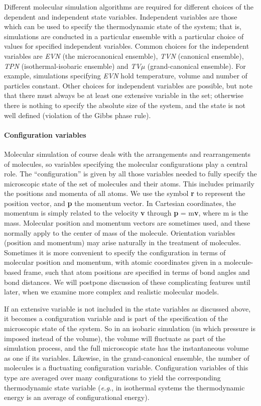 \documentclass[]{article}
\let\oldparagraph\paragraph
\renewcommand{\paragraph}[1]{\oldparagraph{#1}\mbox{}}
\begin{document}
Different molecular simulation algorithms are required for different
choices of the dependent and independent state variables. 
Independent variables are those which can be used to specify the thermodynamic state of the system; that is, simulations are conducted in a particular ensemble with a particular choice of values for specified independent variables.
Common choices
for the independent variables are \emph{EVN} (the microcanonical ensemble), \emph{TVN}
(canonical ensemble), \emph{TPN} (isothermal-isobaric ensemble) and \emph{TV$\mu$}
(grand-canonical ensemble).
For example, simulations specifying \emph{EVN} hold temperature, volume and number of particles constant.
Other choices for independent variables are possible, but note that
there must always be at least one extensive variable in the set;
otherwise there is nothing to specify the absolute size of the system,
and the state is not well defined (violation of the Gibbs phase rule).

\paragraph{Configuration variables}\label{configuration-variables}

Molecular simulation of course deals with the arrangements and
rearrangements of molecules, so variables specifying the molecular
configurations play a central role. The ``configuration'' is given by
all those variables needed to fully specify the microscopic state of the
set of molecules and their atoms. This includes primarily the positions
and momenta of all atoms. We use the symbol \textbf{r} to represent the
position vector, and \textbf{p} the momentum vector. In Cartesian
coordinates, the momentum is simply related to the velocity \textbf{v}
through \textbf{p} = m\textbf{v}, where m is the mass. Molecular
position and momentum vectors are sometimes used, and these normally
apply to the center of mass of the molecule. Orientation variables
(position and momentum) may arise naturally in the treatment of
molecules. Sometimes it is more convenient to specify the configuration
in terms of molecular position and momentum, with atomic coordinates
given in a molecule-based frame, such that atom positions are specified
in terms of bond angles and bond distances. We will postpone discussion
of these complicating features until later, when we examine more complex
and realistic molecular models.

If an extensive variable is not included in the state variables as
discussed above, it becomes a configuration variable and is part of the specification of the microscopic state of the system.
So in an isobaric
simulation (in which pressure is imposed instead of the volume), the
volume will fluctuate as part of the simulation process, and the full
microscopic state has the instantaneous volume as one if its variables.
Likewise, in the grand-canonical ensemble, the number of molecules is a
fluctuating configuration variable. Configuration variables of this type
are averaged over many configurations to yield the corresponding
thermodynamic state variable (\emph{e.g.}, in isothermal systems the
thermodynamic energy is an average of configurational energy).
\end{document}
